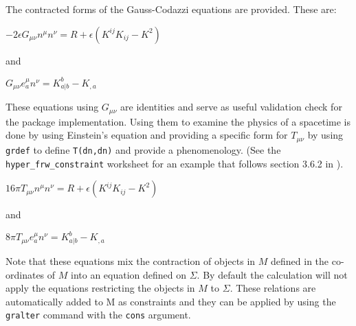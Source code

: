 \documentclass{article}
\begin{document}
The contracted forms of the Gauss-Codazzi equations are provided. These are:
\begin{center}
$-2 \epsilon G_{\mu \nu} n^\mu n^\nu = R + \epsilon \left( K^{i j}K_{ij} -K^2 \right)$ \\
\end{center}
and 
\begin{center}
$G_{\mu \nu} e^\mu_a n^\nu = K^b_{a|b} - K_{,a}$
\end{center}
These equations using $G_{\mu \nu}$ are identities and serve as useful validation check for the package implementation. Using them to 
examine the physics of a spacetime is done by using Einstein's equation and providing a specific form for $T_{\mu \nu}$
by using \texttt{grdef} to define \texttt{T(dn,dn)} and provide a phenomenology. (See the \texttt{hyper\_frw\_constraint} worksheet
for an example that follows section 3.6.2 in \cite{poisson:2004}). 

\begin{center}
$16 \pi T_{\mu \nu} n^\mu n^\nu = R + \epsilon \left( K^{i j}K_{ij} -K^2 \right)$ \\
\end{center}
and 
\begin{center}
$8 \pi T_{\mu \nu} e^\mu_a n^\nu = K^b_{a|b} - K_{,a}$
\end{center}

Note that these equations mix the contraction of objects in $M$ defined in the co-ordinates of $M$ into an equation 
defined on $\Sigma$. By default the 
calculation will not apply the equations restricting the objects in $M$ to $\Sigma$. These relations are automatically
added to M as constraints and they can be applied by using the
\texttt{gralter} command with the \texttt{cons} argument. \\
\end{document}
